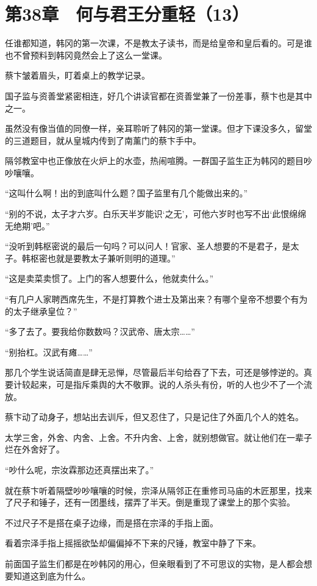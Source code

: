 \section{第38章　何与君王分重轻（13）}

任谁都知道，韩冈的第一次课，不是教太子读书，而是给皇帝和皇后看的。可是谁也不曾预料到韩冈竟然会上了这么一堂课。

蔡卞皱着眉头，盯着桌上的教学记录。

国子监与资善堂紧密相连，好几个讲读官都在资善堂兼了一份差事，蔡卞也是其中之一。

虽然没有像当值的同僚一样，亲耳聆听了韩冈的第一堂课。但才下课没多久，留堂的三道题目，就从皇城内传到了南薰门的蔡卞手中。

隔邻教室中也正像放在火炉上的水壶，热闹喧腾。一群国子监生正为韩冈的题目吵吵嚷嚷。

“这叫什么啊！出的到底叫什么题？国子监里有几个能做出来的。”

“别的不说，太子才六岁。白乐天半岁能识‘之无’，可他六岁时也写不出‘此恨绵绵无绝期’吧。”

“没听到韩枢密说的最后一句吗？可以问人！官家、圣人想要的不是君子，是太子。韩枢密也就是要教太子兼听则明的道理。”

“这是卖菜卖惯了。上门的客人想要什么，他就卖什么。”

“有几户人家聘西席先生，不是打算教个进士及第出来？有哪个皇帝不想要个有为的太子继承皇位？”

“多了去了。要我给你数数吗？汉武帝、唐太宗……”

“别抬杠。汉武有瘫……”

那几个学生说话简直是肆无忌惮，尽管最后半句给吞了下去，可还是够悖逆的。真要计较起来，可是指斥乘舆的大不敬罪。说的人杀头有份，听的人也少不了一个流放。

蔡卞动了动身子，想站出去训斥，但又忍住了，只是记住了外面几个人的姓名。

太学三舍，外舍、内舍、上舍。不升内舍、上舍，就别想做官。就让他们在一辈子烂在外舍好了。

“吵什么呢，宗汝霖那边还真摆出来了。”

就在蔡卞听着隔壁吵吵嚷嚷的时候，宗泽从隔邻正在重修司马庙的木匠那里，找来了尺子和锤子，还有一团墨线，摆弄了半天。倒是重现了课堂上的那个实验。

不过尺子不是搭在桌子边缘，而是搭在宗泽的手指上面。

看着宗泽手指上摇摇欲坠却偏偏掉不下来的尺锤，教室中静了下来。

前面国子监生们都是在吵韩冈的用心，但亲眼看到了不可思议的实物，是人都会想要知道这到底为什么。

